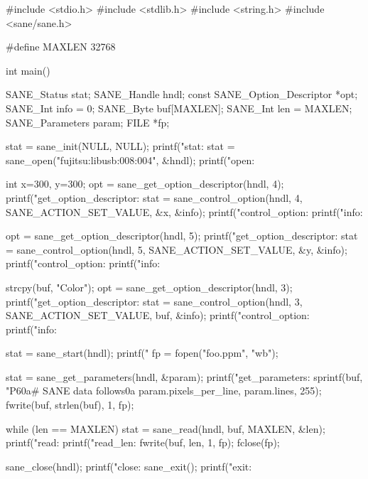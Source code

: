 \documentclass[mingoth,a4paper]{jsarticle}
\begin{document}
\begin{commandline}
#include <stdio.h>
#include <stdlib.h>
#include <string.h>
#include <sane/sane.h>

#define MAXLEN 32768

int main()
{
  SANE_Status stat;
  SANE_Handle hndl;
  const SANE_Option_Descriptor *opt;
  SANE_Int info = 0;
  SANE_Byte buf[MAXLEN];
  SANE_Int len = MAXLEN;
  SANE_Parameters param;
  FILE *fp;

  stat = sane_init(NULL, NULL);
  printf("stat: %
  stat = sane_open("fujitsu:libusb:008:004", &hndl);
  printf("open: %

  int x=300, y=300;
  opt = sane_get_option_descriptor(hndl, 4);
  printf("get_option_descriptor: %
  stat = sane_control_option(hndl, 4, SANE_ACTION_SET_VALUE, &x, &info);
  printf("control_option: %
  printf("info: %

  opt = sane_get_option_descriptor(hndl, 5);
  printf("get_option_descriptor: %
  stat = sane_control_option(hndl, 5, SANE_ACTION_SET_VALUE, &y, &info);
  printf("control_option: %
  printf("info: %

  strcpy(buf, "Color");
  opt = sane_get_option_descriptor(hndl, 3);
  printf("get_option_descriptor: %
  stat = sane_control_option(hndl, 3, SANE_ACTION_SET_VALUE, buf, &info);
  printf("control_option: %
  printf("info: %

  stat = sane_start(hndl);
  printf("%
  fp = fopen("foo.ppm", "wb");

  stat = sane_get_parameters(hndl, &param);
  printf("get_parameters: %
  sprintf(buf, "P6\x0a# SANE data follows\x0a%
    param.pixels_per_line, param.lines, 255);
  fwrite(buf, strlen(buf), 1, fp);


  while (len == MAXLEN) {
    stat = sane_read(hndl, buf, MAXLEN, &len);
    printf("read: %
    printf("read_len: %
    fwrite(buf, len, 1, fp);
  }
  fclose(fp);

  sane_close(hndl);
  printf("close: %
  sane_exit();
  printf("exit: %
}
\end{commandline}
\end{document}
